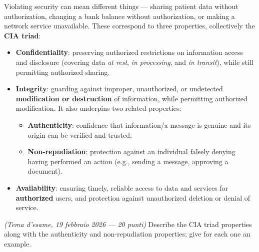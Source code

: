 \documentclass[12pt, a4paper]{article}
\newcounter{esercizio}[section]
\begin{document}
Violating security can mean different things — sharing patient data without authorization, changing a bank balance without authorization, or making a network service unavailable. These correspond to three properties, collectively the \textbf{CIA triad}:

\begin{itemize}
    \item \textbf{Confidentiality}: preserving authorized restrictions on information access and disclosure (covering data \emph{at rest}, \emph{in processing}, and \emph{in transit}), while still permitting authorized sharing.
    \item \textbf{Integrity}: guarding against improper, unauthorized, or undetected \textbf{modification or destruction} of information, while permitting authorized modification. It also underpins two related properties:
    \begin{itemize}
        \item \textbf{Authenticity}: confidence that information/a message is genuine and its origin can be verified and trusted.
        \item \textbf{Non-repudiation}: protection against an individual falsely denying having performed an action (e.g., sending a message, approving a document).
    \end{itemize}
    \item \textbf{Availability}: ensuring timely, reliable access to data and services for \textbf{authorized} users, and protection against unauthorized deletion or denial of service.
\end{itemize}

\begin{tcolorbox}[colback=lightergray!10, colframe=tocsec, title=\textbf{Esercizio \theesercizio}]
\textit{(Tema d'esame, 19 febbraio 2026 — 20 punti)} Describe the CIA triad properties along with the authenticity and non-repudiation properties; give for each one an example.
\end{tcolorbox}
\end{document}

